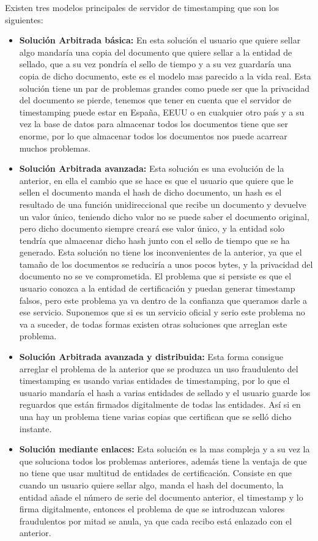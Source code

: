 Existen tres modelos principales de servidor de timestamping que son los siguientes:
\begin{itemize}
\item \textbf{Solución Arbitrada básica:} En esta solución el usuario que quiere sellar algo mandaría una copia del documento que quiere sellar a la entidad de sellado, que a su vez pondría el sello de tiempo y a su vez guardaría una copia de dicho documento, este es el modelo mas parecido a la vida real. Esta solución tiene un par de problemas grandes como puede ser que la privacidad del documento se pierde, tenemos que tener en cuenta que el servidor de timestamping puede estar en España, EEUU o en cualquier otro país y a su vez la base de datos para almacenar todos los documentos tiene que ser enorme, por lo que almacenar todos los documentos nos puede acarrear muchos problemas.

\item \textbf{Solución Arbitrada avanzada:} Esta solución es una evolución de la anterior, en ella el cambio que se hace es que el usuario que quiere que le sellen el documento manda el hash de dicho documento, un hash es el resultado de una función unidireccional que recibe un documento y devuelve un valor único, teniendo dicho valor no se puede saber el documento original, pero dicho documento siempre creará ese valor único, y la entidad solo tendría que almacenar dicho hash junto con el sello de tiempo que se ha generado. Esta solución no tiene los inconvenientes de la anterior, ya que el tamaño de los documentos se reduciría a unos pocos bytes, y la privacidad del documento no se ve comprometida. El problema que si persiste es que el usuario conozca a la entidad de certificación y puedan generar timestamp falsos, pero este problema ya va dentro de la confianza que queramos darle a ese servicio. Suponemos que si es un servicio oficial y serio este problema no va a suceder, de todas formas existen otras soluciones que arreglan este problema.

\item \textbf{Solución Arbitrada avanzada y distribuida:} Esta forma consigue arreglar el problema de la anterior que se produzca un uso fraudulento del timestamping es usando varias entidades de timestamping, por lo que el usuario mandaría el hash a varias entidades de sellado y el usuario guarde los reguardos que están firmados digitalmente de todas las entidades. Así si en una hay un problema tiene varias copias que certifican que se selló dicho instante.

\item \textbf{Solución mediante enlaces:} Esta solución es la mas compleja y a su vez la que soluciona todos los problemas anteriores, además tiene la ventaja de que no tiene que usar multitud de entidades de certificación. Consiste en que cuando un usuario quiere sellar algo, manda el hash del documento, la entidad añade el número de serie del documento anterior, el timestamp y lo firma digitalmente, entonces el problema de que se introduzcan valores fraudulentos por mitad se anula, ya que cada recibo está enlazado con el anterior.
\end{itemize}

